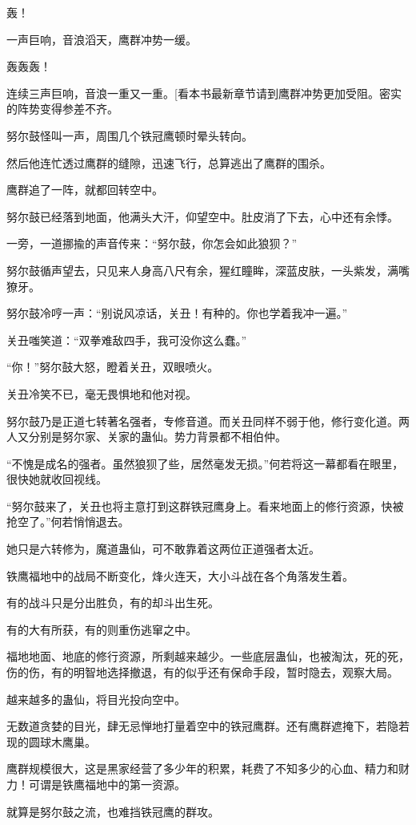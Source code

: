 \begin{this_body}
轰！

一声巨响，音浪滔天，鹰群冲势一缓。

轰轰轰！

连续三声巨响，音浪一重又一重。[看本书最新章节请到鹰群冲势更加受阻。密实的阵势变得参差不齐。

努尔鼓怪叫一声，周围几个铁冠鹰顿时晕头转向。

然后他连忙透过鹰群的缝隙，迅速飞行，总算逃出了鹰群的围杀。

鹰群追了一阵，就都回转空中。

努尔鼓已经落到地面，他满头大汗，仰望空中。肚皮消了下去，心中还有余悸。

一旁，一道挪揄的声音传来：“努尔鼓，你怎会如此狼狈？”

努尔鼓循声望去，只见来人身高八尺有余，猩红瞳眸，深蓝皮肤，一头紫发，满嘴獠牙。

努尔鼓冷哼一声：“别说风凉话，关丑！有种的。你也学着我冲一遍。”

关丑嗤笑道：“双拳难敌四手，我可没你这么蠢。”

“你！”努尔鼓大怒，瞪着关丑，双眼喷火。

关丑冷笑不已，毫无畏惧地和他对视。

努尔鼓乃是正道七转著名强者，专修音道。而关丑同样不弱于他，修行变化道。两人又分别是努尔家、关家的蛊仙。势力背景都不相伯仲。

“不愧是成名的强者。虽然狼狈了些，居然毫发无损。”何若将这一幕都看在眼里，很快她就收回视线。

“努尔鼓来了，关丑也将主意打到这群铁冠鹰身上。看来地面上的修行资源，快被抢空了。”何若悄悄退去。

她只是六转修为，魔道蛊仙，可不敢靠着这两位正道强者太近。

铁鹰福地中的战局不断变化，烽火连天，大小斗战在各个角落发生着。

有的战斗只是分出胜负，有的却斗出生死。

有的大有所获，有的则重伤逃窜之中。

福地地面、地底的修行资源，所剩越来越少。一些底层蛊仙，也被淘汰，死的死，伤的伤，有的明智地选择撤退，有的似乎还有保命手段，暂时隐去，观察大局。

越来越多的蛊仙，将目光投向空中。

无数道贪婪的目光，肆无忌惮地打量着空中的铁冠鹰群。还有鹰群遮掩下，若隐若现的圆球木鹰巢。

鹰群规模很大，这是黑家经营了多少年的积累，耗费了不知多少的心血、精力和财力！可谓是铁鹰福地中的第一资源。

就算是努尔鼓之流，也难挡铁冠鹰的群攻。


\end{this_body}
